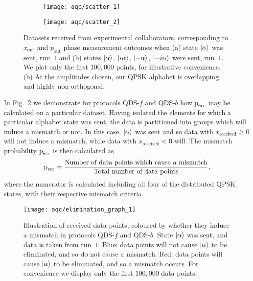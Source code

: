 \begin{figure}[htp]
\captionsetup{width=0.8\linewidth}
\centering
	\begin{subfigure}{0.49\linewidth}
	\centering
	\texttt{[image: aqc/scatter\_1]}
	\caption{}
	\end{subfigure}
	\begin{subfigure}{0.49\linewidth}
	\centering
	\texttt{[image: aqc/scatter\_2]}
	\end{subfigure}
\caption{\label{fig:aqc_scatter} Datasets received from experimental collaborators, corresponding to $x_{\text{out}}$ and $p_{\text{out}}$ phase measurement outcomes when (a) state $\ket{\alpha}$ was sent, run~$1$ and (b) states $\ket{\alpha}$, $\ket{i \alpha}$, $\ket{- \alpha}$, $\ket{- i \alpha}$ were sent, run~$1$. We plot only the first $100,000$ points, for illustrative convenience. (b) At the amplitudes chosen, our QPSK alphabet is overlapping and highly non-orthogonal.}
\end{figure}

In Fig.~\ref{fig:aqc_elimsig} we demonstrate for protocols QDS-$f$ and QDS-$b$ how $\text{p}_{\text{err}}$ may be calculated on a particular dataset. Having isolated the elements for which a particular alphabet state was sent, the data is partitioned into groups which will induce a mismatch or not. In this case, $\ket{\alpha}$ was sent and so data with $x_{\text{received}} \ge 0$ will not induce a mismatch, while data with $x_{\text{received}}<0$ will. The mismatch probability $\text{p}_{\text{err}}$ is then calculated as
\begin{equation}\label{eqn:aqc_data_perr}
\text{p}_{\text{err}} = \frac{\text{Number of data points which cause a mismatch}}{\text{Total number of data points}},
\end{equation}
where the numerator is calculated including all four of the distributed QPSK states, with their respective mismatch criteria.

\begin{figure}[htp]
\captionsetup{width=0.8\linewidth}
\centering
\texttt{[image: aqc/elimination\_graph\_1]}
\caption{\label{fig:aqc_elimsig} Illustration of received data points, coloured by whether they induce a mismatch in protocols QDS-$f$ and QDS-$b$. State $\ket{\alpha}$ was sent, and data is taken from run~$1$. Blue: data points will not cause $\ket{\alpha}$ to be eliminated, and so do not cause a mismatch. Red: data points will cause $\ket{\alpha}$ to be eliminated, and so a mismatch occurs. For convenience we display only the first $100,000$ data points.}
\end{figure}

